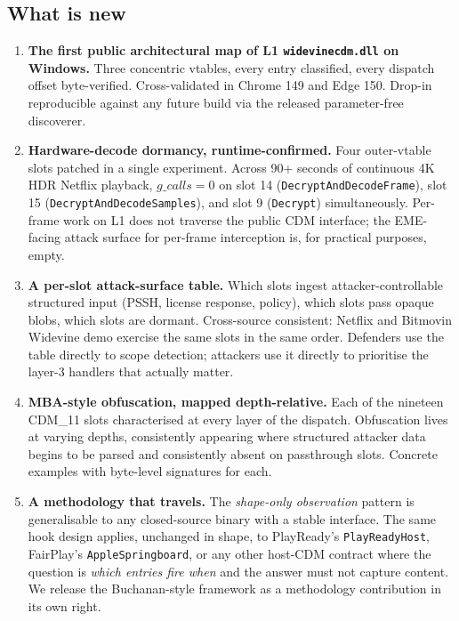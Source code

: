 \documentclass[11pt,letterpaper]{article}
\begin{document}
\subsection*{What is new}

\begin{enumerate}[itemsep=4pt,topsep=2pt]
  \item \textbf{The first public architectural map of L1
        \texttt{widevinecdm.dll} on Windows.}  Three concentric
        vtables, every entry classified, every dispatch offset
        byte-verified.  Cross-validated in Chrome 149 and Edge 150.
        Drop-in reproducible against any future build via the
        released parameter-free discoverer.

  \item \textbf{Hardware-decode dormancy, runtime-confirmed.}  Four
        outer-vtable slots patched in a single experiment.  Across
        90+ seconds of continuous 4K HDR Netflix playback,
        \(g\_calls = 0\) on slot 14
        (\texttt{DecryptAndDecodeFrame}), slot 15
        (\texttt{DecryptAndDecodeSamples}), and slot 9
        (\texttt{Decrypt}) simultaneously.  Per-frame work on L1
        does not traverse the public CDM interface; the EME-facing
        attack surface for per-frame interception is, for practical
        purposes, empty.

  \item \textbf{A per-slot attack-surface table.}  Which slots
        ingest attacker-controllable structured input (PSSH,
        license response, policy), which slots pass opaque blobs,
        which slots are dormant.  Cross-source consistent: Netflix
        and Bitmovin Widevine demo exercise the same slots in the
        same order.  Defenders use the table directly to scope
        detection; attackers use it directly to prioritise the
        layer-3 handlers that actually matter.

  \item \textbf{MBA-style obfuscation, mapped depth-relative.}  Each
        of the nineteen CDM\_11 slots characterised at every layer of
        the dispatch.  Obfuscation lives at varying depths,
        consistently appearing where structured attacker data
        begins to be parsed and consistently absent on
        passthrough slots.  Concrete examples with byte-level
        signatures for each.

  \item \textbf{A methodology that travels.}  The
        \emph{shape-only observation} pattern is generalisable to
        any closed-source binary with a stable interface.  The
        same hook design applies, unchanged in shape, to PlayReady's
        \texttt{PlayReadyHost}, FairPlay's
        \texttt{AppleSpringboard}, or any other host-CDM contract
        where the question is \emph{which entries fire when} and
        the answer must not capture content.  We release the
        Buchanan-style framework as a methodology contribution in
        its own right.


\end{enumerate}
\end{document}
